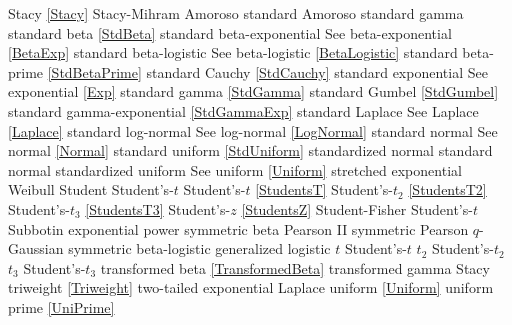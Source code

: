 Stacy 							\dotfill	\eqref{Stacy} 						\ncite	%
Stacy-Mihram					\dotfill	Amoroso								\ncite	%
standard Amoroso				\dotfill	standard gamma 						\ncite	%
standard beta					\dotfill	\eqref{StdBeta} 					\ncite	%
standard beta-exponential		\dotfill	See beta-exponential \eqref{BetaExp}	\ncite	%
standard beta-logistic			\dotfill	See beta-logistic \eqref{BetaLogistic}		\ncite	%
standard beta-prime				\dotfill	\eqref{StdBetaPrime}				\ncite	%
standard Cauchy					\dotfill	\eqref{StdCauchy} 					\ncite	%
standard exponential			\dotfill	See exponential \eqref{Exp} 		\ncite	%
standard gamma 					\dotfill	\eqref{StdGamma} 					\ncite	%
standard Gumbel 				\dotfill	\eqref{StdGumbel} 					\ncite	%
standard gamma-exponential		\dotfill	\eqref{StdGammaExp} 				\ncite	%
standard Laplace				\dotfill	See Laplace \eqref{Laplace}			\ncite	%
standard log-normal				\dotfill	See log-normal \eqref{LogNormal} 	\ncite	%
standard normal 				\dotfill	See normal \eqref{Normal} 			\ncite	%
standard uniform				\dotfill	\eqref{StdUniform}					\ncite	%
standardized normal 			\dotfill	standard normal						\ncite	%
standardized uniform 			\dotfill	See uniform \eqref{Uniform}			\ncite	%
stretched exponential 			\dotfill	Weibull 								
Student							\dotfill 	Student's-$t$						\ncite	%
Student's-$t$					\dotfill	\eqref{StudentsT}  					\ncite	%
Student's-$t_2$					\dotfill	\eqref{StudentsT2}  				\ncite	%
Student's-$t_3$					\dotfill	\eqref{StudentsT3}  				\ncite	
Student's-$z$					\dotfill	\eqref{StudentsZ}					\ncite	%
Student-Fisher					\dotfill	Student's-$t$							%
Subbotin						\dotfill	exponential power					\ncite
symmetric beta					\dotfill	Pearson II							\ncite	%
symmetric Pearson				\dotfill	$q$-Gaussian						\mcite{\self}		%
symmetric beta-logistic			\dotfill	generalized logistic				\mcite{\self}
%
$t$								\dotfill	Student's-$t$ 						\ncite	%
$t_2$							\dotfill	Student's-$t_2$ 					\ncite	%
$t_3$							\dotfill	Student's-$t_3$ 					\ncite
transformed beta				\dotfill	\eqref{TransformedBeta} 			\ncite	%
transformed gamma				\dotfill	Stacy 								\ncite %
triweight						\dotfill	\eqref{Triweight}					\ncite
two-tailed exponential			\dotfill	Laplace								\ncite %
%
uniform  						\dotfill	\eqref{Uniform}						\ncite 	%
uniform prime					\dotfill	\eqref{UniPrime}					\ncite	%
